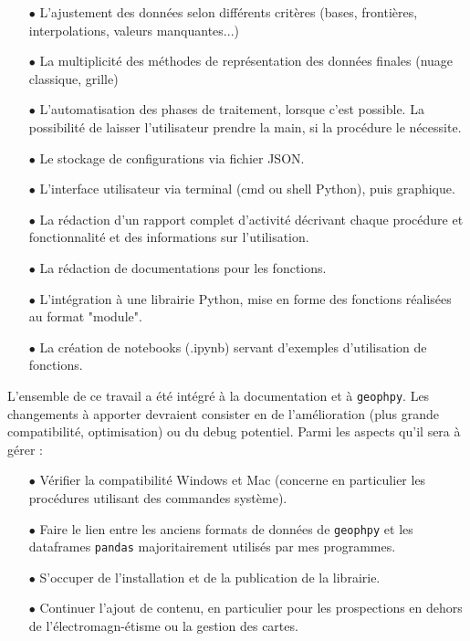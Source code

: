 \documentclass[12pt]{article}
\begin{document}
    \begin{enumerate}
        \item[$\bullet$] L'ajustement des données selon différents critères (bases, frontières, interpolations, valeurs manquantes...)
        \item[$\bullet$] La multiplicité des méthodes de représentation des données finales (nuage classique, grille)
        \item[$\bullet$] L'automatisation des phases de traitement, lorsque c'est possible. La possibilité de laisser l'utilisateur prendre la main, si la procédure le nécessite.
        \item[$\bullet$] Le stockage de configurations via fichier JSON.
        \item[$\bullet$] L'interface utilisateur via terminal (cmd ou shell Python), puis graphique.
        \item[$\bullet$] La rédaction d'un rapport complet d'activité décrivant chaque procédure et fonctionnalité et des informations sur l'utilisation.
        \item[$\bullet$] La rédaction de documentations pour les fonctions.
        \item[$\bullet$] L'intégration à une librairie Python, mise en forme des fonctions réalisées au format "module".
        \item[$\bullet$] La création de notebooks (.ipynb) servant d'exemples d'utilisation de fonctions.
    \end{enumerate}

    
    L'ensemble de ce travail a été intégré à la documentation et à \texttt{geophpy}. Les changements à apporter devraient consister en de l'amélioration (plus grande compatibilité, optimisation) ou du debug potentiel. Parmi les aspects qu'il sera à gérer :

    \begin{enumerate}
        \item[$\bullet$] Vérifier la compatibilité Windows et Mac (concerne en particulier les procédures utilisant des commandes système).
        \item[$\bullet$] Faire le lien entre les anciens formats de données de \texttt{geophpy} et les dataframes \texttt{pandas} majoritairement utilisés par mes programmes.
        \item[$\bullet$] S'occuper de l'installation et de la publication de la librairie.
        \item[$\bullet$] Continuer l'ajout de contenu, en particulier pour les prospections en dehors de l'électromagn-étisme ou la gestion des cartes.
    \end{enumerate}
\end{document}
